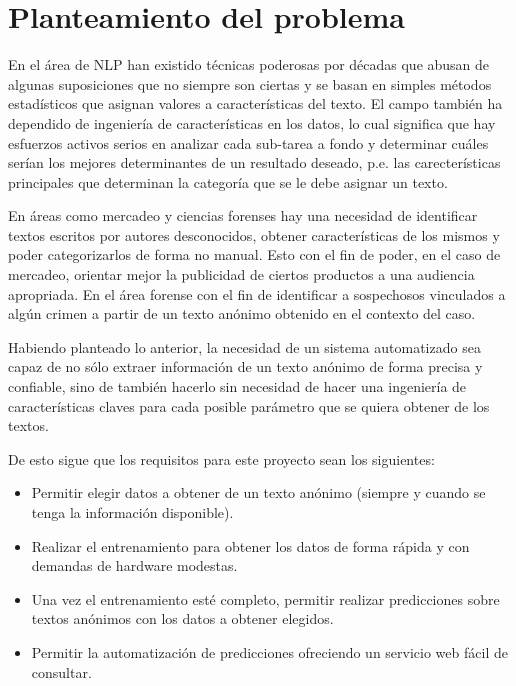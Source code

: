 \section{Planteamiento del problema}

En el área de NLP han existido técnicas poderosas por décadas que abusan de algunas suposiciones que no siempre son ciertas y se basan en simples métodos estadísticos que asignan valores a características del texto. El campo también ha dependido de ingeniería de características en los datos, lo cual significa que hay esfuerzos activos serios en analizar cada sub-tarea a fondo y determinar cuáles serían los mejores determinantes de un resultado deseado, p.e. las carecterísticas principales que determinan la categoría que se le debe asignar un texto.

En áreas como mercadeo y ciencias forenses hay una necesidad de identificar textos escritos por autores desconocidos, obtener características de los mismos y poder categorizarlos de forma no manual. Esto con el fin de poder, en el caso de mercadeo, orientar mejor la publicidad de ciertos productos a una audiencia apropriada. En el área forense con el fin de identificar a sospechosos vinculados a algún crimen a partir de un texto anónimo obtenido en el contexto del caso.

Habiendo planteado lo anterior, la necesidad de un sistema automatizado sea capaz de no sólo extraer información de un texto anónimo de forma precisa y confiable, sino de también hacerlo sin necesidad de hacer una ingeniería de características claves para cada posible parámetro que se quiera obtener de los textos.

De esto sigue que los requisitos para este proyecto sean los siguientes:

\begin{itemize}
\item Permitir elegir datos a obtener de un texto anónimo (siempre y cuando se tenga la información disponible).
\item Realizar el entrenamiento para obtener los datos de forma rápida y con demandas de hardware modestas.
\item Una vez el entrenamiento esté completo, permitir realizar predicciones sobre textos anónimos con los datos a obtener elegidos.
\item Permitir la automatización de predicciones ofreciendo un servicio web fácil de consultar.
\end{itemize}





